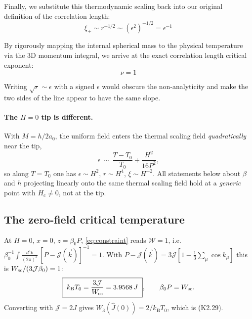 \documentclass[11pt,a4paper]{article}
\newcommand{\Jc}{\mathcal{J}}
\newcommand{\Jh}{\hat J}
\newcommand{\kB}{k_{\mathrm B}}
\newcommand{\bk}{\vec k}
\newcommand{\dk}{\frac{d^3k}{(2\pi)^3}}
\newcommand{\Wc}{\mathcal{W}}
\newcommand{\Jc}{\mathcal{J}}
\newcommand{\kB}{k_{\mathrm B}}
\newcommand{\bk}{\vec k}
\newcommand{\dk}{\frac{d^3k}{(2\pi)^3}}
\newcommand{\Wc}{\mathcal{W}}
\begin{document}
Finally, we substitute this thermodynamic scaling back into our original definition of the correlation length:
$$\xi_+ \sim r^{-1/2} \sim (\epsilon^2)^{-1/2} = \epsilon^{-1}$$

By rigorously mapping the internal spherical mass to the physical temperature via the 3D momentum integral, we arrive at the exact correlation length critical exponent:
$$\nu = 1$$

Writing $\sqrt r\sim\epsilon$ with a signed $\epsilon$ would obscure the non-analyticity and
make the two sides of the line appear to have the same slope.


\paragraph{The $H=0$ tip is different.} With $M=h/2a_0$, the uniform field enters the
thermal scaling field \emph{quadratically} near the tip,
\begin{equation}
  \epsilon\ \sim\ \frac{T-T_0}{T_0}+\frac{H^2}{16P^2},
\end{equation}
so along $T=T_0$ one has $\epsilon\sim H^2$, $r\sim H^4$, $\xi\sim H^{-2}$. All statements
below about $\beta$ and $h$ projecting linearly onto the same thermal scaling field hold at
a \emph{generic} point with $H_c\neq0$, not at the tip.

\subsection{The zero-field critical temperature}
\label{sec:T0}
At $H=0$, $x=0$, $z=\beta_0P$, \eqref{eq:constraint} reads $\Wc=1$, i.e.
$\beta_0^{-1}\int\!\dk\,[P-\Jc(\bk)]^{-1}=1$. With
$P-\Jc(\bk)=3\Jc[1-\tfrac13\sum_\mu\cos k_\mu]$ this is $W_{\rm sc}/(3\Jc\beta_0)=1$:
\begin{equation}
  \boxed{\ \kB T_0=\frac{3\Jc}{W_{\rm sc}}=3.9568\,J\ },
  \qquad
  \beta_0P=W_{\rm sc} .
\end{equation}
Converting with $\Jc=2J$ gives $W_3(\Jh(0))=2/\kB T_0$, which is (K2.29). 
\end{document}
